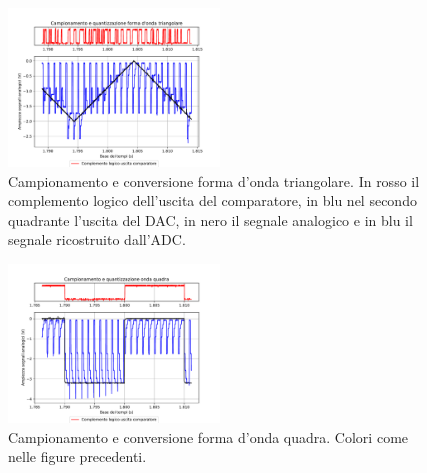 \documentclass[journal]{IEEEtran}
\begin{document}
\begin{figure}[H]%
\begin{center}
\includegraphics[trim = {0 25 0 0},clip, width=0.50\textwidth]{analysis/output/triangle_wave_aq.pdf}
\caption{Campionamento e conversione forma d'onda triangolare. In rosso il complemento logico dell'uscita del comparatore, in blu nel secondo quadrante l'uscita del DAC, in nero il segnale analogico e in blu il segnale ricostruito dall'ADC.}
\label{fig:Triangular_wave_aquisition}
\end{center}
\end{figure}

\begin{figure}[H]%
\begin{center}
\includegraphics[trim = {0 25 0 0},clip, width=0.50\textwidth]{analysis/output/square_wave_aq.pdf}
\caption{Campionamento e conversione forma d'onda quadra. Colori come nelle figure precedenti.}
\label{fig:Square_wave_aquisition}
\end{center}
\end{figure}
\end{document}
